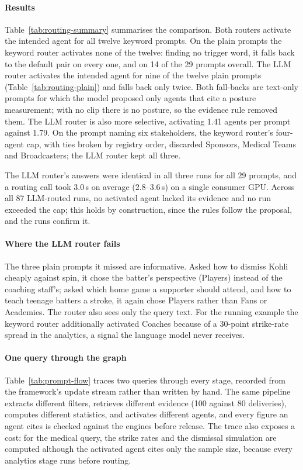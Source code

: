 \paragraph{Results}
Table~\ref{tab:routing-summary} summarises the comparison. Both routers
activate the intended agent for all twelve keyword prompts. On the plain
prompts the keyword router activates none of the twelve: finding no trigger
word, it falls back to the default pair on every one, and on 14 of the 29
prompts overall. The LLM router activates the intended agent for nine of the
twelve plain prompts (Table~\ref{tab:routing-plain}) and falls back only twice.
Both fall-backs are text-only prompts for which the model proposed only agents
that cite a posture measurement; with no clip there is no posture, so the
evidence rule removed them. The LLM router is also more selective, activating
1.41 agents per prompt against 1.79. On the prompt naming six stakeholders, the
keyword router's four-agent cap, with ties broken by registry order, discarded
Sponsors, Medical Teams and Broadcasters; the LLM router kept all three.

The LLM router's answers were identical in all three runs for all 29 prompts,
and a routing call took 3.0\,s on average (2.8--3.6\,s) on a single consumer
GPU. Across all 87 LLM-routed runs, no activated agent lacked its evidence and
no run exceeded the cap; this holds by construction, since the rules follow the
proposal, and the runs confirm it.

\paragraph{Where the LLM router fails}
The three plain prompts it missed are informative. Asked how to dismiss Kohli
cheaply against spin, it chose the batter's perspective (Players) instead of
the coaching staff's; asked which home game a supporter should attend, and how
to teach teenage batters a stroke, it again chose Players rather than Fans or
Academies. The router also sees only the query text. For the running example
the keyword router additionally activated Coaches because of a 30-point
strike-rate spread in the analytics, a signal the language model never
receives.

\paragraph{One query through the graph}
Table~\ref{tab:prompt-flow} traces two queries through every stage, recorded
from the framework's update stream rather than written by hand. The same
pipeline extracts different filters, retrieves different evidence (100 against
80 deliveries), computes different statistics, and activates different agents,
and every figure an agent cites is checked against the engines before release.
The trace also exposes a cost: for the medical query, the strike rates and the
dismissal simulation are computed although the activated agent cites only the
sample size, because every analytics stage runs before routing.

